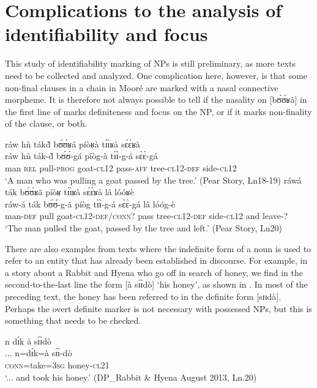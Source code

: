 \documentclass[output=paper]{langsci/langscibook}
\begin{document}
\section{Complications to the analysis of identifiability and focus}\label{sec:teo:7}

This study of identifiability marking of NPs is still preliminary, as more texts need to be collected and analyzed. One complication here, however, is that some non-final clauses in a chain in Mooré are marked with a nasal connective morpheme. It is therefore not always possible to tell if the nasality on [b\'ʊ\'ʊʁã] in the first line of  marks definiteness and focus on the NP, or if it marks non-finality of the clause, or both.

\ea\label{ex:teo:57}
\glll ráw hǹ ták\`{d} b\'ʊ\'ʊʁá píòʁà t\'ɪ\`ɪʁà s\'ɛ\`ɛʁà\\
ráw hǹ ták-\`{d} b\'ʊ\'ʊ-gá píòg-à t\`ɪ\`ɪ-g-á s\`ɛ\`ɛ-gá\\
man \textsc{rel} pull-\textsc{prog} goat-\textsc{cl12} pass-\textsc{aff} tree\textsc{-cl12-def} side\textsc{-cl12}{\rmfnm}\\
\glt ‘A man who was pulling a goat passed by the tree.’ (Pear Story, Ln18-19)
\z
{}
\ea\label{ex:teo:58}
\glll ráwá ták b\'ʊ\'ʊʁã píòʁ t\'ɪ\`ɪʁà s\'ɛ\`ɛʁà lâ lóóʁè\\
ráw-á ták b\'ʊ\'ʊ-g-ã píòg t\`ɪ\`ɪ-g-á s\`ɛ\`ɛ-gá lâ lóóg-è\\ 
man-\textsc{def} pull goat-\textsc{cl12-}\textsc{def/conn?} pass tree\textsc{-cl12-def} side\textsc{-cl12} and leave-?\\
\glt ‘The man pulled the goat, passed by the tree and left.’ (Pear Story, Ln20)
\z

There are also examples from texts where the indefinite form of a noun is used to refer to an entity that has already been established in discourse. For example, in a story about a Rabbit and Hyena who go off in search of honey, we find in the second-to-the-last line the form [à s\'ɪ\`ɪdò] ‘his honey’, as shown in . In most of the preceding text, the honey has been referred to in the definite form [sɪɪdà]. Perhaps the overt definite marker is not necessary with possessed NPs, but this is something that needs to be checked. 


\ea\label{ex:teo:59}
 {n d\'ɪk à} s\'ɪ\`ɪdò\\
{...} n=d\'ɪk=à s\'ɪ\`ɪ-dò\\
{}  \textsc{conn}=take=\textsc{3sg} honey-\textsc{cl21}\\
\glt ‘... and took his honey.’ (DP\_Rabbit \& Hyena August 2013, Ln.20)
\z
\end{document}
